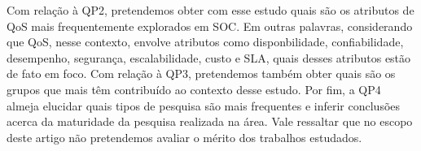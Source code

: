 
Com rela\c{c}\~{a}o \`{a} QP2, pretendemos obter com esse estudo quais s\~{a}o os atributos de QoS mais frequentemente explorados em SOC. Em outras palavras, considerando que QoS, nesse contexto, envolve atributos como disponbilidade, confiabilidade, desempenho, seguran\c{c}a, escalabilidade, custo e SLA, quais desses atributos est\~{a}o de fato em foco. Com rela\c{c}\~{a}o \`{a} QP3, pretendemos tamb\'{e}m obter quais s\~{a}o os grupos que mais t\^{e}m contribu\'{i}do ao contexto desse estudo. Por fim, a QP4 almeja elucidar quais tipos de pesquisa s\~{a}o mais frequentes e inferir conclusões acerca da maturidade da pesquisa realizada na \'{a}rea. Vale ressaltar que no escopo deste artigo n\~{a}o pretendemos avaliar o m\'{e}rito dos trabalhos estudados.


